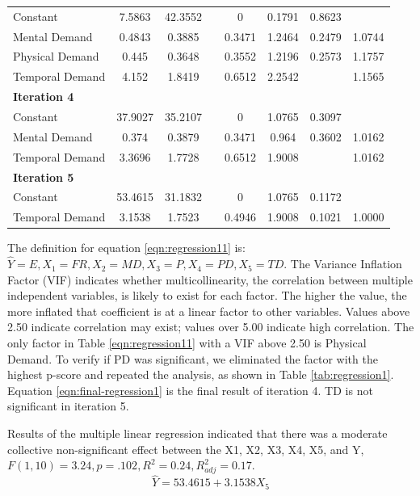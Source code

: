 \documentclass[thesis]{fputhesis}
\begin{document}
\begin{body}
\begin{table}[h!]
{\begin{tabular}{@{}l *{2}{S[table-format=2.4]} c *{4}{S[table-format=1.4]} @{}}
            Constant            &   7.5863 &  42.3552  &&   0      &   0.1791  &   0.8623    &           \\
            Mental Demand       &   0.4843 &   0.3885  &&   0.3471 &   1.2464  &   0.2479    & 1.0744    \\ 
            Physical Demand     &   0.445  &   0.3648  &&   0.3552 &   1.2196  &   0.2573    & 1.1757    \\
            Temporal Demand     &   4.152  &   1.8419  &&   0.6512 &   2.2542  &     & 1.1565    \\
            \textbf{Iteration 4} \\
            Constant            &  37.9027 &  35.2107  &&   0      &   1.0765  &   0.3097    &           \\ 
            Mental Demand       &   0.374  &   0.3879  &&   0.3471 &   0.964   &   0.3602    & 1.0162    \\
            Temporal Demand     &   3.3696 &   1.7728  &&   0.6512 &   1.9008  &    & 1.0162    \\
            \textbf{Iteration 5} \\
            Constant            &  53.4615 &  31.1832  &&   0      &   1.0765  &   0.1172    &           \\
            Temporal Demand     &   3.1538 &   1.7523  &&   0.4946 &   1.9008  &   0.1021    & 1.0000    \\
        \bottomrule
    \end{tabular}%
    }
\end{table}

The definition for equation \ref{eqn:regression11} is: \(\hat{Y} = E, X_1 = FR, X_2 = MD, X_3 = P, X_4 = PD, X_5 = TD\). The Variance Inflation Factor (VIF) indicates whether multicollinearity, the correlation between multiple independent variables, is likely to exist for each factor. The higher the value, the more inflated that coefficient is at a linear factor to other variables. Values above 2.50 indicate correlation may exist; values over 5.00 indicate high correlation. The only factor in Table \ref{eqn:regression11} with a VIF above 2.50 is Physical Demand.  To verify if PD was significant, we eliminated the factor with the highest p-score and repeated the analysis, as shown in Table \ref{tab:regression1}. Equation \ref{eqn:final-regression1} is the final result of iteration 4. TD is not significant in iteration 5.

Results of the multiple linear regression indicated that there was a moderate collective non-significant effect between the X1, X2, X3, X4, X5, and Y, \(F(1, 10) = 3.24, p = .102, R^2 = 0.24, R^2_{adj} = 0.17\).
\begin{equation}
    \label{eqn:final-regression1}
    \hat{Y} = 53.4615 + 3.1538X_5
\end{equation}


\end{body}
\end{document}
